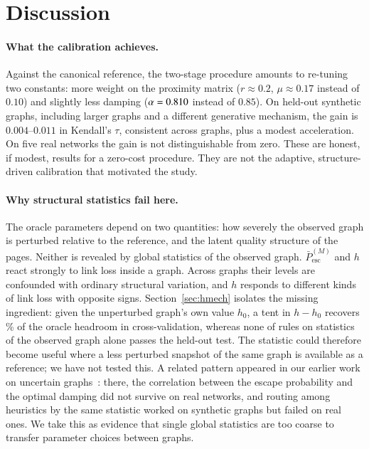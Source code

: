 \documentclass[11pt,a4paper]{article}
\theoremstyle{definition}
\theoremstyle{remark}
\newcommand{\Pbar}{\bar P^{(M)}_{\mathrm{esc}}}
\begin{document}
\FloatBarrier
\section{Discussion}
\label{sec:discussion}

\paragraph{What the calibration achieves.} Against the canonical reference, the two-stage procedure
amounts to re-tuning two constants: more weight on the proximity matrix ($r\approx0.2$, $\mu\approx0.17$
instead of $0.10$) and slightly less damping ($\alpha=0.810$ instead of $0.85$). On held-out
synthetic graphs, including larger graphs and a different generative mechanism, the gain is
$0.004$--$0.011$ in Kendall's $\tau$, consistent across graphs, plus a modest acceleration. On five real networks
the gain is not distinguishable from zero. These are honest, if modest, results for a zero-cost
procedure. They are not the adaptive, structure-driven calibration that motivated the study.

\paragraph{Why structural statistics fail here.} The oracle parameters depend on two quantities: how
severely the observed graph is perturbed relative to the reference, and the latent quality structure
of the pages. Neither is revealed by global statistics of the observed graph. $\Pbar$ and $h$ react
strongly to link loss inside a graph. Across graphs their levels are confounded with ordinary
structural variation, and $h$ responds to different kinds of link loss with opposite signs.
Section~\ref{sec:hmech} isolates the missing ingredient: given the unperturbed graph's own value $h_0$,
a tent in $h-h_0$ recovers \NmDhShare\% of the oracle headroom in cross-validation, whereas none of
\NmRules{} rules on statistics of the observed graph alone passes the held-out test. The statistic
could therefore become useful where a less perturbed snapshot of the same graph is available as a
reference; we have not tested this. A related
pattern appeared in our earlier work on uncertain graphs~\cite{konstantellos26}: there, the correlation
between the escape probability and the optimal damping did not survive on real networks, and routing
among heuristics by the same statistic worked on synthetic graphs but failed on real ones. We take this
as evidence that single global statistics are too coarse to transfer parameter choices between graphs.
\end{document}
